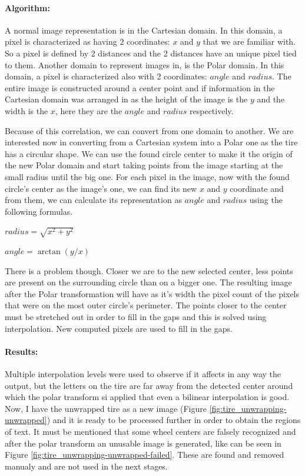 \paragraph*{Algorithm:}\mbox{}\par
A normal image representation is in the Cartesian domain. In this domain, a pixel is characterized as having 2 coordinates: $x$ and $y$ that we are familiar with. So a pixel is defined by 2 distances and the 2 distances have an unique pixel tied to them.
Another domain to represent images in, is the Polar domain. In this domain, a pixel is characterized also with 2 coordinates: $angle$ and $radius$. The entire image is constructed around a center point and if information in the Cartesian domain was arranged in as the height of the image is the $y$ and the width is the $x$, here they are the $angle$ and $radius$ respectively.

Because of this correlation, we can convert from one domain to another. We are interested now in converting from a Cartesian system into a Polar one as the tire has a circular shape. We can use the found circle center to make it the origin of the new Polar domain and start taking points from the image starting at the small radius until the big one. For each pixel in the image, now with the found circle's center as the image's one, we can find its new $x$ and $y$ coordinate and from them, we can calculate its representation as $angle$ and $radius$ using the following formulas.

$radius = \sqrt{x^2 + y^2}$

$angle = \arctan(y/x)$

There is a problem though. Closer we are to the new selected center, less points are present on the surrounding circle than on a bigger one. The resulting image after the Polar transformation will have as it's width the pixel count of the pixels that were on the most outer circle's perimeter. The points closer to the center must be stretched out in order to fill in the gaps and this is solved using interpolation. New computed pixels are used to fill in the gaps.

\paragraph*{Results:}\mbox{}\par
Multiple interpolation levels were used to observe if it affects in any way the output, but the letters on the tire are far away from the detected center around which the polar transform si applied that even a bilinear interpolation is good. Now, I have the unwrapped tire as a new image (Figure \ref{fig:tire_unwrapping-unwrapped}) and it is ready to be processed further in order to obtain the regions of text. It must be mentioned that some wheel centers are falsely recognized and after the polar transform an unusable image is generated, like can be seen in Figure \ref{fig:tire_unwrapping-unwrapped-failed}. These are found and removed manualy and are not used in the next stages.

